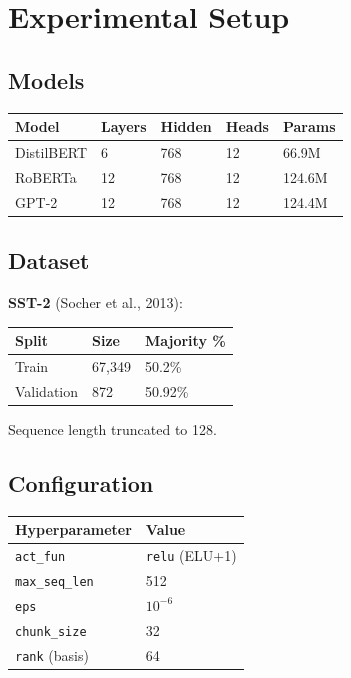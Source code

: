 
\section{Experimental Setup}

\subsection{Models}

\begin{table}[H]
\centering
\small
\begin{tabular}{lllll}
\toprule
\textbf{Model} & \textbf{Layers} & \textbf{Hidden} & \textbf{Heads} & \textbf{Params} \\
\midrule
DistilBERT & 6 & 768 & 12 & 66.9M \\
RoBERTa & 12 & 768 & 12 & 124.6M \\
GPT-2 & 12 & 768 & 12 & 124.4M \\
\bottomrule
\end{tabular}
\end{table}

\subsection{Dataset}

\textbf{SST-2} (Socher et al., 2013):

\begin{table}[H]
\centering
\small
\begin{tabular}{lll}
\toprule
\textbf{Split} & \textbf{Size} & \textbf{Majority \%} \\
\midrule
Train & 67,349 & 50.2\% \\
Validation & 872 & 50.92\% \\
\bottomrule
\end{tabular}
\end{table}

Sequence length truncated to 128.

\subsection{Configuration}

\begin{table}[H]
\centering
\small
\begin{tabular}{ll}
\toprule
\textbf{Hyperparameter} & \textbf{Value} \\
\midrule
\texttt{act\_fun} & \texttt{relu} (ELU+1) \\
\texttt{max\_seq\_len} & 512 \\
\texttt{eps} & $10^{-6}$ \\
\texttt{chunk\_size} & 32 \\
\texttt{rank} (basis) & 64 \\
\bottomrule
\end{tabular}
\end{table}


